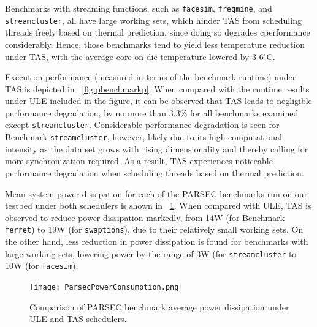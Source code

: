 \documentclass[times, 10pt,twocolumn]{IEEEtran}
\begin{document}
Benchmarks with streaming functions, such as \texttt{facesim},
\texttt{freqmine}, and \texttt{streamcluster}, all have large working
sets, which hinder TAS from scheduling threads freely based on thermal
prediction, since doing so degrades cperformance considerably.  Hence,
those benchmarks tend to yield less temperature reduction under TAS,
with the average core on-die temperature lowered by 3-6$^{\circ}$C.  

Execution performance (measured in terms of the benchmark runtime) under TAS 
is depicted in \figurename~\ref{fig:pbenchmarkp}.
When compared with the runtime results under ULE included in the figure,
it can be observed that TAS leads to negligible performance degradation,
by no more than 3.3\% for all benchmarks examined except \texttt{streamcluster}.
Considerable performance degradation is seen for Benchmark \texttt{streamcluster},
however, likely due to its high computational intensity as the data set
grows with rising dimensionality and thereby calling for
more synchronization required.
As a result, TAS experiences noticeable performance degradation
when scheduling threads based on thermal prediction.

Mean system power dissipation for each of the PARSEC benchmarks run on our testbed
under both schedulers is shown in \figurename~\ref{fig:pbenchmark}.
When compared with ULE, TAS is observed to reduce 
power dissipation markedly, from 14W (for Benchmark \texttt{ferret}) 
to 19W (for \texttt{swaptions}), due to their relatively small working sets.
On the other hand, less reduction in power dissipation is found for
benchmarks with large working sets, lowering power by the range of
3W (for \texttt{streamcluster} to 10W (for \texttt{facesim}). 
  
\begin{figure}[tbp]
  \texttt{[image: ParsecPowerConsumption.png]}
  \caption{Comparison of PARSEC benchmark average power dissipation under ULE and TAS schedulers.}
  \label{fig:pbenchmark}
\end{figure}

\end{document}
